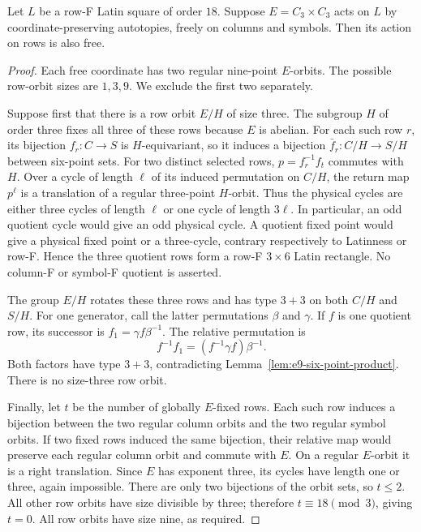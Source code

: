\begin{theorem}\label{thm:e9-two-free-coordinates}
Let $L$ be a row-F Latin square of order $18$. Suppose
$E=C_3\times C_3$ acts on $L$ by coordinate-preserving autotopies,
freely on columns and symbols. Then its action on rows is also free.
\end{theorem}
\begin{proof}
Each free coordinate has two regular nine-point $E$-orbits. The possible
row-orbit sizes are $1,3,9$. We exclude the first two separately.

Suppose first that there is a row orbit $E/H$ of size three. The subgroup
$H$ of order three fixes all three of these rows because $E$ is abelian.
For each such row $r$, its bijection $f_r:C\to S$ is $H$-equivariant,
so it induces a bijection $\bar f_r:C/H\to S/H$ between six-point sets.
For two distinct selected rows, $p=f_r^{-1}f_t$ commutes with $H$.
Over a cycle of length $\ell$ of its induced permutation on $C/H$,
the return map $p^\ell$ is a translation of a regular three-point
$H$-orbit. Thus the physical cycles are either three cycles of length
$\ell$ or one cycle of length $3\ell$. In particular, an odd quotient
cycle would give an odd physical cycle. A quotient fixed point would
give a physical fixed point or a three-cycle, contrary respectively
to Latinness or row-F. Hence the three quotient rows form a row-F
$3\times6$ Latin rectangle. No column-F or symbol-F quotient is asserted.

The group $E/H$ rotates these three rows and has type $3+3$ on both
$C/H$ and $S/H$. For one generator, call the latter permutations
$\beta$ and $\gamma$. If $f$ is one quotient row, its successor is
$f_1=\gamma f\beta^{-1}$. The relative permutation is
\[
 f^{-1}f_1=(f^{-1}\gamma f)\beta^{-1}.
\]
Both factors have type $3+3$, contradicting
Lemma~\ref{lem:e9-six-point-product}. There is no size-three row orbit.

Finally, let $t$ be the number of globally $E$-fixed rows. Each such
row induces a bijection between the two regular column orbits and the
two regular symbol orbits. If two fixed rows induced the same bijection,
their relative map would preserve each regular column orbit and commute
with $E$. On a regular $E$-orbit it is a right translation. Since $E$
has exponent three, its cycles have length one or three, again impossible.
There are only two bijections of the orbit sets, so $t\leq2$. All other
row orbits have size divisible by three; therefore $t\equiv18\pmod3$,
giving $t=0$. All row orbits have size nine, as required.
\end{proof}

